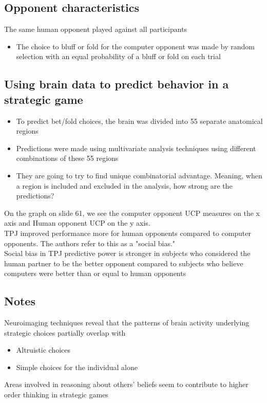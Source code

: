 \subsection{Opponent characteristics}
The same human opponent played against all participants
\begin{itemize}
\begin{itemize}
    \item His base pay was ten dollars
    \item He received one bonus of five dollar in-game earnings were sufficiently large
    \item He received a second bonus of five dollars for helping his call rate between 45$\%$ and 55$\%$ over the course of the experiment 
\end{itemize}
\item The choice to bluff or fold for the computer opponent was made by random selection with an equal probability of a bluff or fold on each trial
\end{itemize}

\subsection{Using brain data to predict behavior in a strategic game}
\begin{itemize}
    \item To predict bet/fold choices, the brain was divided into 55 separate anatomical regions
    \item Predictions were made using multivariate analysis techniques using different combinations of these 55 regions
    \item They are going to try to find unique combinatorial advantage. Meaning, when a region is included and excluded in the analysis, how strong are the predictions?
\end{itemize}
On the graph on slide 61, we see the computer opponent UCP measures on the x axis and Human opponent UCP on the y axis.
\\TPJ improved performance more for human opponents compared to computer opponents. The authors refer to this as a "social bias."
\\Social bias in TPJ predictive power is stronger in subjects who considered the human partner to be the better opponent compared to subjects who believe computers were better than or equal to human opponents

\subsection{Notes}
Neuroimaging techniques reveal that the patterns of brain activity underlying strategic choices partially overlap with
\begin{itemize}
    \item Altruistic choices
    \item Simple choices for the individual alone

\end{itemize}
Areas involved in reasoning about others' beliefs seem to contribute to higher order thinking in strategic games
